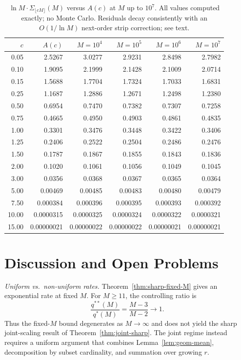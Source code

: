 \documentclass[11pt]{article}
\theoremstyle{remark}
\begin{document}
\begin{table}[!htbp]
\centering
\caption{$\ln M \cdot \Sigma_{\lfloor cM \rfloor}(M)$ versus $A(c)$ at $M$ up to $10^7$. All values computed exactly; no Monte Carlo. Residuals decay consistently with an $O(1/\ln M)$ next-order strip correction; see text.}
\label{tab:joint}
\small
\begin{tabular}{rrrrrr}
\toprule
$c$ & $A(c)$ & $M = 10^4$ & $M = 10^5$ & $M = 10^6$ & $M = 10^7$ \\
\midrule
0.05 & 2.5267 & 3.0277 & 2.9231 & 2.8498 & 2.7982 \\
0.10 & 1.9095 & 2.1999 & 2.1428 & 2.1009 & 2.0714 \\
0.15 & 1.5688 & 1.7704 & 1.7324 & 1.7033 & 1.6831 \\
0.25 & 1.1687 & 1.2886 & 1.2671 & 1.2498 & 1.2380 \\
0.50 & 0.6954 & 0.7470 & 0.7382 & 0.7307 & 0.7258 \\
0.75 & 0.4665 & 0.4950 & 0.4903 & 0.4861 & 0.4835 \\
1.00 & 0.3301 & 0.3476 & 0.3448 & 0.3422 & 0.3406 \\
1.25 & 0.2406 & 0.2522 & 0.2504 & 0.2486 & 0.2476 \\
1.50 & 0.1787 & 0.1867 & 0.1855 & 0.1843 & 0.1836 \\
2.00 & 0.1020 & 0.1061 & 0.1056 & 0.1049 & 0.1045 \\
3.00 & 0.0356 & 0.0368 & 0.0367 & 0.0365 & 0.0364 \\
5.00 & 0.00469 & 0.00485 & 0.00483 & 0.00480 & 0.00479 \\
7.50 & 0.000384 & 0.000396 & 0.000395 & 0.000393 & 0.000392 \\
10.00 & 0.0000315 & 0.0000325 & 0.0000324 & 0.0000322 & 0.0000321 \\
15.00 & 0.00000021 & 0.00000022 & 0.00000022 & 0.00000021 & 0.00000021 \\
\bottomrule
\end{tabular}
\end{table}

\section{Discussion and Open Problems}\label{sec:discussion}

\emph{Uniform vs.\ non-uniform rates.} Theorem~\ref{thm:sharp-fixed-M} gives an exponential rate at fixed $M$. For $M \geq 11$, the controlling ratio is
\[
\frac{q^{**}(M)}{q^{*}(M)} = \frac{M-3}{M-2} \longrightarrow 1.
\]
Thus the fixed-$M$ bound degenerates as $M \to \infty$ and does not yield the sharp joint-scaling result of Theorem~\ref{thm:joint-sharp}. The joint regime instead requires a uniform argument that combines Lemma~\ref{lem:geom-mean}, decomposition by subset cardinality, and summation over growing $r$.
\end{document}
